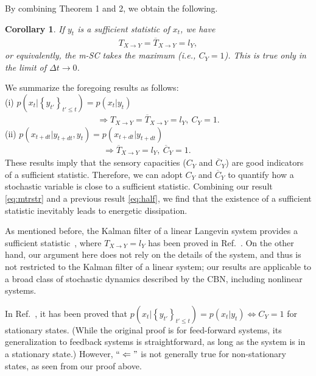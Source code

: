 \documentclass[%
 reprint,
 amsmath,amssymb,
 aps,
]{revtex4-1}
\newcommand{\balign}[1]{\begin{align} #1 \end{align}}
\newcommand\mtr{T_{X\to Y}}
\newcommand\str{\overline{T}_{X\to Y}}
\theoremstyle{plain}
\newtheorem{cor}{Corollary}
\begin{document}
By combining Theorem 1 and 2, we obtain the following.
\begin{cor}
{\rm If $y_t$ is a sufficient statistic of $x_t$, we have}
\balign{
\mtr=\str=l_{Y},
}
{\rm or equivalently, the m-SC takes the maximum (i.e., $C_Y=1$).
This is true only in the limit of $\Delta t \to 0$.}
\end{cor}

We summarize the foregoing results as follows:\\

\noindent
(i) $p(x_t|\left\{y_{t'}\right\}_{t'\leq t})=p(x_t|y_t)$
\balign{
\Rightarrow \mtr=\str=l_{Y},\ C_Y=1. \label{eq:mtrstr}
}
(ii) $p(x_{t+dt}|y_{t+dt},y_t)=p(x_{t+dt}|y_{t+dt})$
\balign{
\Rightarrow \str=l_{Y}, \ \overline{C}_Y=1. \label{eq:mtrstr2}\ \ \ \ \ \ \ \ \ \ \ \ 
}
These results imply that the sensory capacities ($C_Y$ and $\overline{C}_Y$) are good indicators of a sufficient statistic.
Therefore, we can adopt $C_Y$ and $\overline{C}_Y$ to quantify how a stochastic variable is close to a sufficient statistic. Combining our result \eqref{eq:mtrstr} and a previous result \eqref{eq:half}, we find that the existence of a sufficient statistic inevitably leads to energetic dissipation.

As mentioned before, the Kalman filter of a linear Langevin system provides a sufficient statistic~\cite{Astrom}, where $\mtr=l_{Y}$ has been proved in Ref.~\cite{Horowitz2014}. On the other hand, our argument here does not rely on the details of the system, and thus is not restricted to the Kalman filter of a linear system; our results are applicable to a broad class of stochastic dynamics described by the CBN, including nonlinear systems.

In Ref.~\cite{Hartich2016}, it has been proved that $p(x_t|\left\{y_{t'}\right\}_{t'\leq t})=p(x_t|y_t) \Leftrightarrow C_Y=1$ for stationary states. (While the original proof is for feed-forward systems, its generalization to feedback systems is straightforward, as long as the system is in a stationary state.)  However, $``\Leftarrow"$ is not generally true for non-stationary states, as seen from our proof above.
\end{document}
